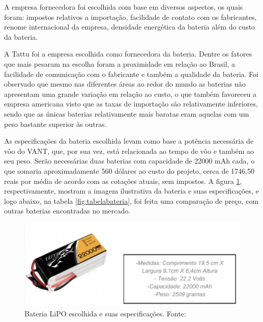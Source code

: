 A empresa fornecedora foi escolhida com base em diversos aspectos, os quais foram: impostos relativos a importação, facilidade de contato com os fabricantes, renome internacional da empresa, densidade energética da bateria além do custo da bateria.

A  Tattu foi a empresa escolhida como fornecedora da bateria.  Dentre os fatores que mais pesaram na escolha foram a proximidade em relação ao Brasil, a facilidade de comunicação com o fabricante e também a qualidade da bateria. Foi observado que mesmo nas diferentes áreas ao redor do mundo as baterias não apresentam uma grande variação em relação ao custo, o que também favoreceu a empresa americana visto que as taxas de importação são relativamente inferiores, sendo que as únicas baterias relativamente mais baratas eram aquelas com um peso bastante superior às outras.

As especificações da bateria escolhida levam como base a potência necessária de vôo do VANT, que, por sua vez, está relacionada ao tempo 
de vôo e também ao seu peso.  Serão necessárias duas baterias com capacidade de 22000 mAh cada, o que somaria aproximadamente 560 dólares
ao custo do projeto, cerca de 1746,50 reais por média de acordo com as cotações atuais, sem impostos. A figura \ref{fig:baterialipo}, respectivamente, 
mostram a imagem ilustrativa da bateria e suas especificações, e logo abaixo, na tabela \ref{fig:tabelabateria}, foi feita uma comparação de preço, com outras 
baterias encontradas no mercado.


\begin{figure}[H]
    \centering
	\includegraphics[keepaspectratio=true,scale=0.6]{figuras/baterialipo.eps}
    \caption{Bateria LiPO escolhida e suas especificações. Fonte: \cite{gensace}}
    \label{fig:baterialipo}
\end{figure}

